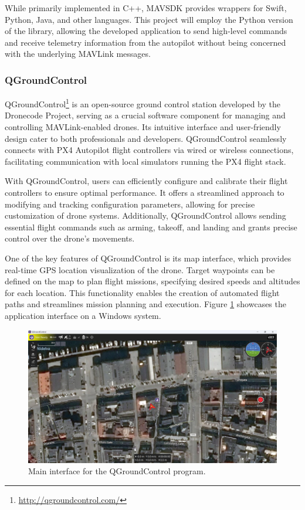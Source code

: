 While primarily implemented in C++, MAVSDK provides wrappers for Swift, Python, Java, and other languages. This project will employ the Python version of the library, allowing the developed application to send high-level commands and receive telemetry information from the autopilot without being concerned with the underlying MAVLink messages.


\subsubsection{QGroundControl}
\label{subsec:qgc}

QGroundControl\footnote{\url{http://qgroundcontrol.com/}} is an open-source ground control station developed by the Dronecode Project, serving as a crucial software component for managing and controlling MAVLink-enabled drones. Its intuitive interface and user-friendly design cater to both professionals and developers. QGroundControl seamlessly connects with PX4 Autopilot flight controllers via wired or wireless connections, facilitating communication with local simulators running the PX4 flight stack.

With QGroundControl, users can efficiently configure and calibrate their flight controllers to ensure optimal performance. It offers a streamlined approach to modifying and tracking configuration parameters, allowing for precise customization of drone systems. Additionally, QGroundControl allows sending essential flight commands such as arming, takeoff, and landing and grants precise control over the drone's movements.

One of the key features of QGroundControl is its map interface, which provides real-time GPS location visualization of the drone. Target waypoints can be defined on the map to plan flight missions, specifying desired speeds and altitudes for each location. This functionality enables the creation of automated flight paths and streamlines mission planning and execution. Figure \ref{fig:qgc-map} showcases the application interface on a Windows system.

\begin{figure}
  \centering
  \includegraphics[width=\textwidth,keepaspectratio]{img/qgc-map.png}
  \caption{Main interface for the QGroundControl program.}
  \label{fig:qgc-map}
\end{figure}

